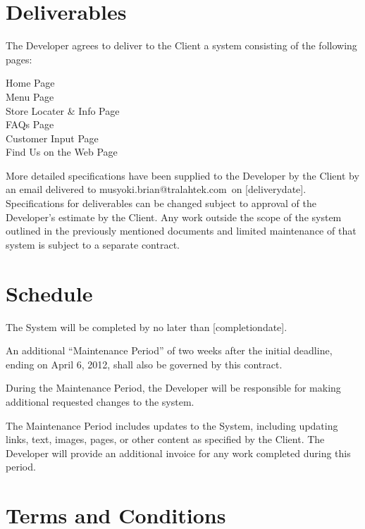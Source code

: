 \documentclass[a4paper,12pt]{article} %
\makeatletter
\newcommand{\YourEmail}{musyoki.brian@tralahtek.com}
\newcommand{\DeliveryDate}{[deliverydate]}
\newcommand{\CompletionDate}{[completiondate]}
\makeatother
\begin{document}
\section{Deliverables}

The Developer agrees to deliver to the Client a system consisting of the following pages:

Home Page\\
Menu Page\\
Store Locater \& Info Page\\
FAQs Page\\
Customer Input Page\\
Find Us on the Web Page

More detailed specifications have been supplied to the Developer by the Client by an email delivered to \YourEmail~on \DeliveryDate. Specifications for deliverables can be changed subject to approval of the Developer's estimate by the Client. Any work outside the scope of the system outlined in the previously mentioned documents and limited maintenance of that system is subject to a separate contract.


\section{Schedule}

The System will be completed by no later than \CompletionDate.

An additional ``Maintenance Period'' of two weeks after the initial deadline, ending on April 6, 2012, shall also be governed by this contract.

During the Maintenance Period, the Developer will be responsible for making additional requested changes to the system.

The Maintenance Period includes updates to the System, including updating links, text, images, pages, or other content as specified by the Client. The Developer will provide an additional invoice for any work completed during this period.


\section{Terms and Conditions}
\end{document}

